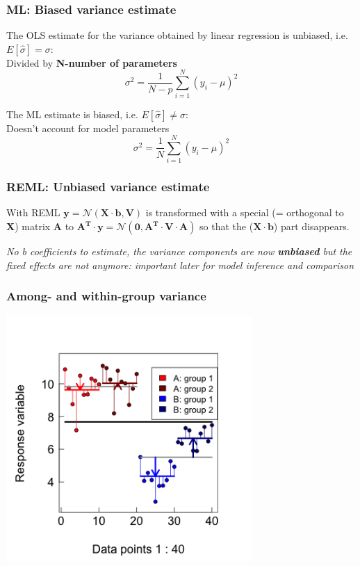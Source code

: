 \documentclass{beamer}
\begin{document}
\begin{frame}
\frametitle{ML: Biased variance estimate}
\large
The OLS estimate for the variance obtained by linear regression is unbiased, i.e. $\mathit{E}[\hat{\sigma}] = \sigma$: \\
Divided by \textbf{N-number of parameters}
\[
\sigma^2 = \frac{1}{N - p} \sum_{i=1}^{N} (y_i - \mu)^2
\]
\vspace{0.2cm}

The ML estimate is biased, i.e. $\mathit{E}[\hat{\sigma}] \neq \sigma$: \\
Doesn't account for model parameters
\[
\sigma^2 = \frac{1}{N} \sum_{i=1}^{N} (y_i - \mu)^2
\]
\end{frame}

\begin{frame}
\frametitle{REML: Unbiased variance estimate}
\large
With REML $\mathbf{y} = \mathcal{N} (\mathbf{X} \cdot \mathbf{b}, \mathbf{V})$ is transformed with a special (= orthogonal to \textbf{X}) matrix \textbf{A} to $\mathbf{A^T} \cdot \mathbf{y} = \mathcal{N} (\mathbf{0}, \mathbf{A^T} \cdot \mathbf{V} \cdot \mathbf{A})$ so that the ($\mathbf{X} \cdot \mathbf{b}$)
 part disappears.
 \vspace{0.2cm}

 \textit{No b coefficients to estimate, the variance components are now \textbf{unbiased} but the fixed effects are not anymore: important later for model inference and comparison}
\end{frame}

\begin{frame}
    \frametitle{Among- and within-group variance}
    \centering
    \includegraphics[width=0.7\textwidth]{lectures/day_5_theory_of_mems/figures/unnamed-chunk-20-1.png}
\end{frame}
\end{document}
